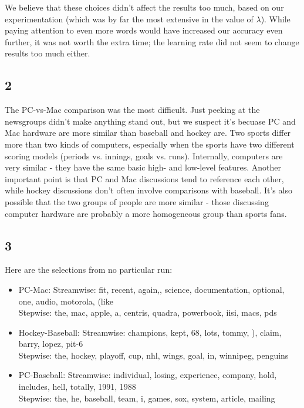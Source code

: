 \documentclass{article}
\begin{document}
  We believe that these choices didn't affect the results too much, based on our experimentation (which was by far the most extensive in the value of $\lambda$). While paying attention to even more words would have increased our accuracy even further, it was not worth the extra time; the learning rate did not seem to change results too much either.

\subsection{2}
The PC-vs-Mac comparison was the most difficult. Just peeking at the newsgroups didn't make anything stand out, but we suspect it's becuase PC and Mac hardware are more similar than baseball and hockey are.
Two sports differ more than two kinds of computers, especially when the sports have two different scoring models (periods vs. innings, goals vs. runs).
Internally, computers are very similar - they have the same basic high- and low-level features.
Another important point is that PC and Mac discussions tend to reference each other, while hockey discussions don't often involve comparisons with baseball.
It's also possible that the two groups of people are more similar - those discussing computer hardware are probably a more homogeneous group than sports fans.

\subsection{3}
Here are the selections from no particular run:

\begin{itemize}
  \item PC-Mac: Streamwise: fit, recent, again,, science, documentation, optional, one, audio, motorola, (like\\
Stepwise: the, mac, apple, a, centris, quadra, powerbook, iisi, macs, pds

\item Hockey-Baseball: Streamwise: champions, kept, 68, lots, tommy, ), claim, barry, lopez, pit-6\\
Stepwise: the, hockey, playoff, cup, nhl, wings, goal, in, winnipeg, penguins

\item PC-Baseball: Streamwise: individual, losing, experience, company, hold, includes, hell, totally, 1991, 1988\\
Stepwise: the, he, baseball, team, i, games, sox, system, article, mailing
\end{itemize}
\end{document}
